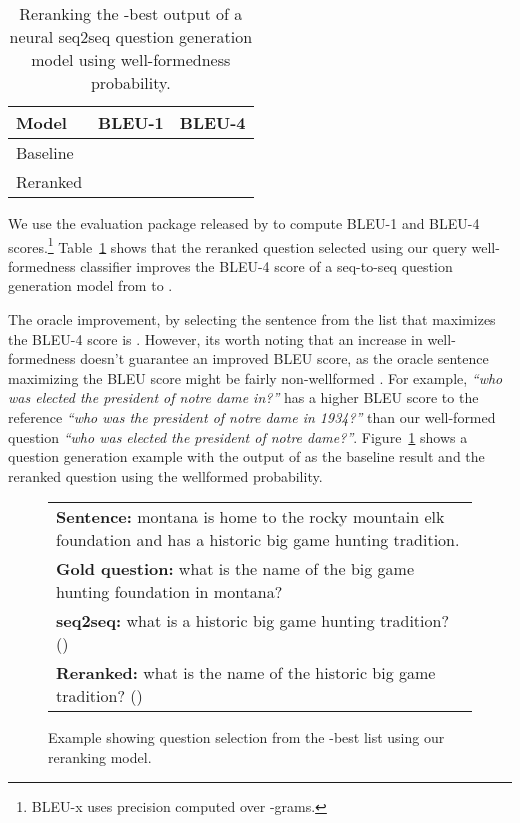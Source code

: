 \documentclass[11pt,a4paper]{article}
\newcommand{\ignore}[1]{}
\begin{document}
\begin{table}[!tb]
  \centering
  \begin{tabular}{|lrr|}
  \hline
  Model & BLEU-1 & BLEU-4\\
  \hline
  Baseline &  &  \\
  Reranked &  &  \\
  \hline
  \end{tabular}
  \caption{Reranking the -best output of a neural seq2seq question generation model using well-formedness probability.}
  \label{tab:rerank}
\end{table}

We use the evaluation package released by  to compute
BLEU-1 and BLEU-4 scores.\footnote{BLEU-x uses precision computed over -grams.} Table~\ref{tab:rerank} shows that the reranked question
selected using our query well-formedness classifier improves the BLEU-4 score of a
seq-to-seq question generation model from  to .
\ignore{Out of the k questions in the test set, our model helped select a better
question   times which corresponds to  of the total test set.}
The oracle improvement, by selecting the sentence from the list that maximizes
the BLEU-4 score is .
However, its worth noting that an increase in well-formedness doesn't guarantee an improved
BLEU score, as the oracle sentence maximizing the BLEU score might be fairly non-wellformed
\cite{badbleu}. For example, \textit{``who was elected the president of notre dame in?''}
has a higher BLEU score to the reference \textit{``who was the president of notre dame in 1934?''}
than our well-formed question \textit{``who was elected the president of notre dame?''}.
Figure~\ref{fig:rerankexample}
shows a question generation example with the output of  
as the baseline result and the reranked question using the wellformed probability.


\begin{figure}[!tb]
\centering
\begin{tabular}{|p{7cm}|}
\hline
\textbf{Sentence:} montana is home to the rocky mountain elk foundation and has a historic big game hunting tradition.\\
\textbf{Gold question:} what is the name of the big game hunting foundation in montana?\\
\hline
\textbf{seq2seq:} what is a historic big game hunting tradition? ()\\
\textbf{Reranked:} what is the name of the historic big game tradition? ()\\
\hline
\end{tabular}
\label{fig:rerankexample}
\caption{Example showing question selection from the -best list using our reranking model.}
\end{figure}
\end{document}
